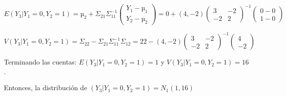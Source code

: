 \begin{problem}[7]
\[
E(Y_3|Y_1=0,Y_2 = 1) = µ_2 + Σ_{21}Σ_{11}^{-1}\begin{pmatrix}Y_1 - µ_1\\Y_2-µ_2\end{pmatrix} =  0 + (4,-2) \begin{pmatrix} 3&-2\\-2&2\end{pmatrix}^{-1} \begin{pmatrix}0-0\\1-0\end{pmatrix}
\]

\[
V(Y_3|Y_1=0,Y_2=1) = Σ_22 - Σ_{21}Σ_{11}^{-1}Σ_{12} =  22 - \left(4,-2\right) \begin{pmatrix} 3&-2\\-2&2 \end{pmatrix}^{-1} \begin{pmatrix}4\\-2\end{pmatrix} 
\]

Terminando las cuentas: $E(Y_3|Y_1=0,Y_2 = 1) = 1$ y $V(Y_3|Y_1=0,Y_2=1) = 16$.

Entonces, la distribución de $(Y_3|Y_1=0,Y_2=1) = N_1(1,16)$

\end{problem}

